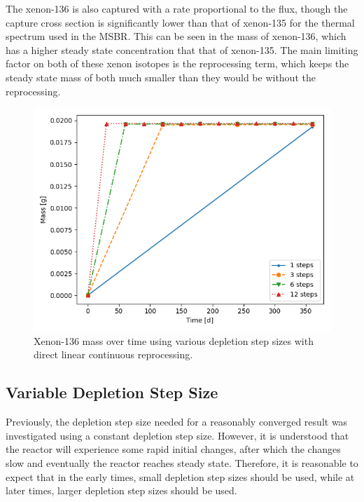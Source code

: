The xenon-136 is also captured with a rate proportional to the flux, though the capture cross section is significantly lower than that of xenon-135 for the thermal spectrum used in the MSBR. This can be seen in the mass of xenon-136, which has a higher steady state concentration that that of xenon-135. The main limiting factor on both of these xenon isotopes is the reprocessing term, which keeps the steady state mass of both much smaller than they would be without the reprocessing.

\begin{figure}[H]
  \centering
  \includegraphics[scale=0.5]{images/DL_NSTEP_Xe-136_mass-large.png}
  \caption{Xenon-136 mass over time using various depletion step sizes with direct linear continuous reprocessing.}
   \label{fig:DL-cont-xe136-2}
\end{figure}


\subsection{Variable Depletion Step Size}

Previously, the depletion step size needed for a reasonably converged result was investigated using a constant depletion step size. However, it is understood that the reactor will experience some rapid initial changes, after which the changes slow and eventually the reactor reaches steady state. Therefore, it is reasonable to expect that in the early times, small depletion step sizes should be used, while at later times, larger depletion step sizes should be used.

